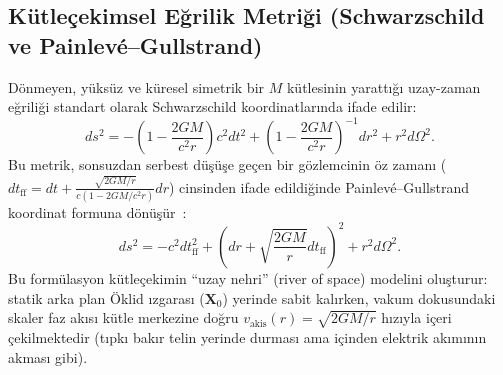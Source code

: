 \subsection{Kütleçekimsel Eğrilik Metriği (Schwarzschild ve Painlev\'e--Gullstrand)}
Dönmeyen, yüksüz ve küresel simetrik bir $M$ kütlesinin yarattığı uzay-zaman eğriliği standart olarak Schwarzschild koordinatlarında ifade edilir:
\begin{equation}
    ds^2 = -\left(1 - \frac{2GM}{c^2 r}\right) c^2 dt^2 + \left(1 - \frac{2GM}{c^2 r}\right)^{-1} dr^2 + r^2 d\Omega^2.
    \label{eq:schwarzschild_standart}
\end{equation}
Bu metrik, sonsuzdan serbest düşüşe geçen bir gözlemcinin öz zamanı ($dt_{\mathrm{ff}} = dt + \frac{\sqrt{2GM/r}}{c(1 - 2GM/c^2 r)} dr$) cinsinden ifade edildiğinde Painlev\'e--Gullstrand koordinat formuna dönüşür~\cite{painleve1921, gullstrand1922}:
\begin{equation}
    ds^2 = -c^2 dt_{\mathrm{ff}}^2 + \left( dr + \sqrt{\frac{2GM}{r}} dt_{\mathrm{ff}} \right)^2 + r^2 d\Omega^2.
    \label{eq:painleve_standart}
\end{equation}
Bu formülasyon kütleçekimin ``uzay nehri'' (river of space) modelini oluşturur: statik arka plan Öklid ızgarası ($\mathbf{X}_0$) yerinde sabit kalırken, vakum dokusundaki skaler faz akısı kütle merkezine doğru $v_{\mathrm{akis}}(r) = \sqrt{2GM/r}$ hızıyla içeri çekilmektedir (tıpkı bakır telin yerinde durması ama içinden elektrik akımının akması gibi).

